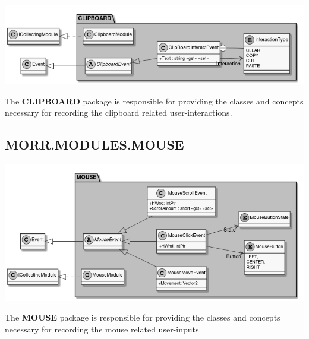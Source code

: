 \begin{center}
    \includegraphics[width=1.0\textwidth]{resources/Packages/MODULES_CLIPBOARD.png}
\end{center}

The \textbf{CLIPBOARD} package is responsible for providing the classes and concepts necessary for recording the clipboard related user-interactions.

\begin{packclass}
\end{packclass}

\begin{packenum}
\end{packenum}

\newpage
\subsection*{MORR.MODULES.MOUSE}

\begin{center}
    \includegraphics[width=1.0\textwidth]{resources/Packages/MODULES_MOUSE.png}
\end{center}

The \textbf{MOUSE} package is responsible for providing the classes and concepts necessary for recording the mouse related user-inputs.

\begin{packclass}
\end{packclass}

